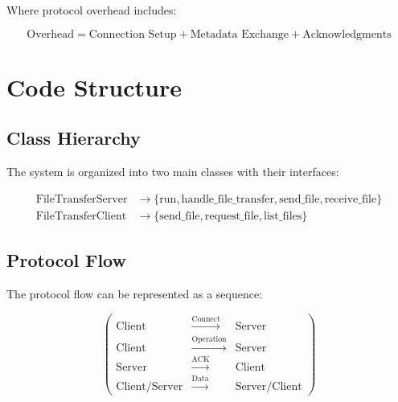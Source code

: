 \documentclass{article}
\begin{document}
Where protocol overhead includes:

\[
\text{Overhead} = \text{Connection Setup} + \text{Metadata Exchange} + \text{Acknowledgments}
\]

\section{Code Structure}

\subsection{Class Hierarchy}
The system is organized into two main classes with their interfaces:

\begin{align*}
\text{FileTransferServer} &\rightarrow \{\text{run}, \text{handle\_file\_transfer}, \text{send\_file}, \text{receive\_file}\} \\
\text{FileTransferClient} &\rightarrow \{\text{send\_file}, \text{request\_file}, \text{list\_files}\}
\end{align*}

\subsection{Protocol Flow}
The protocol flow can be represented as a sequence:

\[
\begin{pmatrix}
\text{Client} & \xrightarrow{\text{Connect}} & \text{Server} \\
\text{Client} & \xrightarrow{\text{Operation}} & \text{Server} \\
\text{Server} & \xrightarrow{\text{ACK}} & \text{Client} \\
\text{Client/Server} & \xrightarrow{\text{Data}} & \text{Server/Client}
\end{pmatrix}
\]
\end{document}
